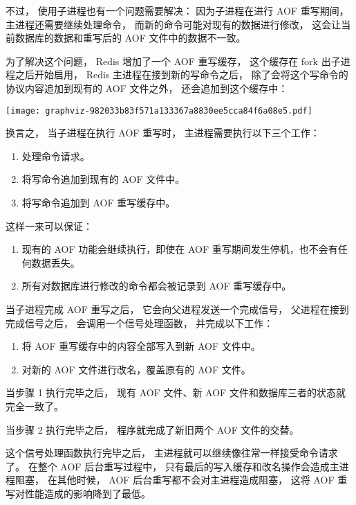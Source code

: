 \documentclass[a4paper,11pt,english]{sphinxmanual}
\begin{document}
不过，
使用子进程也有一个问题需要解决：
因为子进程在进行 AOF 重写期间，
主进程还需要继续处理命令，
而新的命令可能对现有的数据进行修改，
这会让当前数据库的数据和重写后的 AOF 文件中的数据不一致。

为了解决这个问题，
Redis 增加了一个 AOF 重写缓存，
这个缓存在 fork 出子进程之后开始启用，
Redis 主进程在接到新的写命令之后，
除了会将这个写命令的协议内容追加到现有的 AOF 文件之外，
还会追加到这个缓存中：

\texttt{[image: graphviz-982033b83f571a133367a8830ee5cca84f6a08e5.pdf]}

换言之，
当子进程在执行 AOF 重写时，
主进程需要执行以下三个工作：
\begin{enumerate}
\item {} 
处理命令请求。

\item {} 
将写命令追加到现有的 AOF 文件中。

\item {} 
将写命令追加到 AOF 重写缓存中。

\end{enumerate}

这样一来可以保证：
\begin{enumerate}
\item {} 
现有的 AOF 功能会继续执行，即使在 AOF 重写期间发生停机，也不会有任何数据丢失。

\item {} 
所有对数据库进行修改的命令都会被记录到 AOF 重写缓存中。

\end{enumerate}

当子进程完成 AOF 重写之后，
它会向父进程发送一个完成信号，
父进程在接到完成信号之后，
会调用一个信号处理函数，
并完成以下工作：
\begin{enumerate}
\item {} 
将 AOF 重写缓存中的内容全部写入到新 AOF 文件中。

\item {} 
对新的 AOF 文件进行改名，覆盖原有的 AOF 文件。

\end{enumerate}

当步骤 1 执行完毕之后，
现有 AOF 文件、新 AOF 文件和数据库三者的状态就完全一致了。

当步骤 2 执行完毕之后，
程序就完成了新旧两个 AOF 文件的交替。

这个信号处理函数执行完毕之后，
主进程就可以继续像往常一样接受命令请求了。
在整个 AOF 后台重写过程中，
只有最后的写入缓存和改名操作会造成主进程阻塞，
在其他时候，
AOF 后台重写都不会对主进程造成阻塞，
这将 AOF 重写对性能造成的影响降到了最低。
\end{document}
